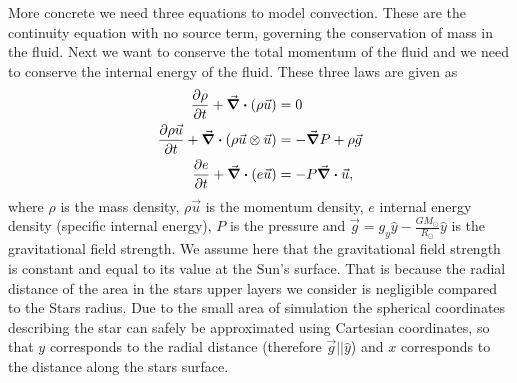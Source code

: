 \documentclass{emulateapj}
\begin{document}
	More concrete we need three equations to model convection. These are the continuity equation with no source term, governing the conservation of mass in the fluid. Next we want to conserve the total momentum of the fluid and we need to conserve the internal energy of the fluid. These three laws are given as
	\begin{align}
		\pdv{\rho}{t} + \div{(\rho \vec{u})} &= 0
		\label{eq:continuity}\\
		\pdv{\rho \vec{u}}{t} + \div{(\rho \vec{u}\otimes\vec{u})} &= -\grad{P} + \rho \vec{g}
		\label{eq:momentum}\\
		\pdv{e}{t} + \div{(e\vec{u})} &= -P\div{\vec{u}},
		\label{eq:energy}
	\end{align} 
	where $\rho$ is the mass density, $\rho \vec{u}$ is the momentum density, $e$ internal energy density (specific internal energy), $P$ is the pressure and $\vec{g} = g_y \hat{y} -\frac{GM_\odot}{R_\odot}\hat{y}$ is the gravitational field strength. We assume here that the gravitational field strength is constant and equal to its value at the Sun's surface. That is because the radial distance of the area in the stars upper layers we consider is negligible compared to the Stars radius. Due to the small area of simulation the spherical coordinates describing the star can safely be approximated using Cartesian coordinates, so that $y$ corresponds to the radial distance (therefore $\vec{g}||\hat{y}$) and $x$ corresponds to the distance along the stars surface.
	
\end{document}
